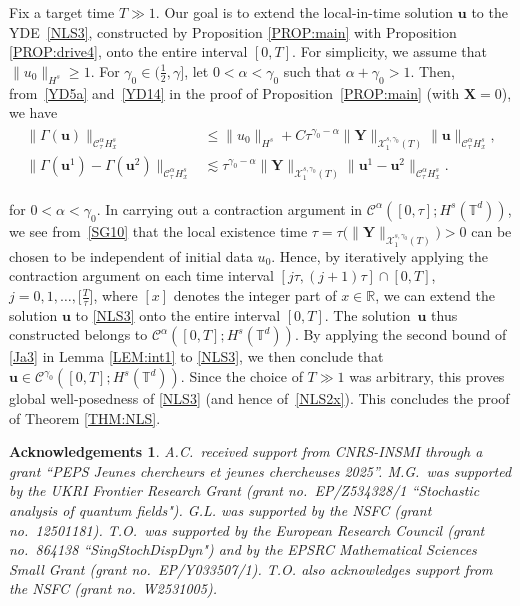 \documentclass[letterpaper, 11pt,  reqno]{amsart}
\newcommand{\1}{\hspace{0.5mm}\textup{I}\hspace{0.5mm}}
\newcommand{\noi}{\noindent}
\newcommand{\R}{\mathbb{R}}
\newcommand{\T}{\mathbb{T}}
\newcommand{\CC}{\mathcal{C}}
\newcommand{\al}{\alpha}
\newcommand{\g}{\gamma}
\newcommand{\G}{\Gamma}
\newcommand{\les}{\lesssim}
\newcommand{\cC}{\mathcal{C}}
\newcommand{\cX}{\mathcal{X}}
\newcommand{\uu}{\mathbf{u}}
\newcommand{\XX}{\mathbf{X}}
\newcommand{\YY}{\mathbf{Y}}
\newtheorem*{ackno}{Acknowledgements}
\numberwithin{equation}{section}
\numberwithin{theorem}{section}
\begin{document}
Fix a target time $T\gg 1$.
Our goal is to extend the local-in-time solution $\uu$
to the YDE~\eqref{NLS3}, 
constructed by Proposition \ref{PROP:main} with Proposition \ref{PROP:drive4},  
onto the entire interval $[0, T]$.
For simplicity, we assume that $\|u_0\|_{H^s} \ge 1$.
For $ \g_0 \in \big(\frac 12 ,  \g\big]$, 
let $0 < \al < \g_0$ such that $\al + \g_0 >1$.
Then, 
from~\eqref{YD5a} and~\eqref{YD14} in the proof of Proposition~\ref{PROP:main}
(with $\XX = 0$), we have 
\begin{align}
\begin{split}
\|\G(\uu)\|_{\CC^\al_\tau H^s_x}
& \le \|u_0\|_{H^s} 
+  C\tau^{\g_0 - \al}
\|\YY\|_{\cX^{s, \g_0}_1(T)}
\|\uu\|_{\CC^\al_{\tau } H^s_x}, \\
 \|\G(\uu^1)- \G(\uu^2)\|_{\cC^\al _{\tau} H^s_x}
&  \les 
\tau^{\g_0 - \al}
\|\YY\|_{\cX^{s, \g_0}_1(T)}\|\uu^1- \uu^2 \|_{\CC^\al _\tau H^s_x}.
\end{split}
\label{SG10}
\end{align}

\noi
for $0 < \al < \g_0$.
In carrying out a contraction argument in 
$\cC^\al([0, \tau]; H^s(\T^d))$, 
we see from~\eqref{SG10}
that the local existence time $\tau = \tau \big(\|\YY\|_{\cX^{s, \g_0}_1(T)}\big) >0$
can be chosen to be  independent  of initial data $u_0$.
Hence, by  iteratively applying the contraction argument 
on each time interval $[j\tau, (j+1)\tau]\cap [0, T]$, $j = 0,1,  \dots, \big[\frac T\tau\big] $, 
where $[x]$ denotes the integer part of $x \in \R$, 
we can extend the solution $\uu$ to \eqref{NLS3}
onto the entire interval $[0, T]$.
The solution~$\uu$ thus constructed belongs to 
$\cC^\al([0, T]; H^s(\T^d))$.
By applying the second bound of \eqref{Ja3}
in Lemma \ref{LEM:int1} to \eqref{NLS3}, 
we then conclude that 
$\uu \in \cC^{\g_0}([0, T]; H^s(\T^d))$.
Since the choice of $T\gg1$ was arbitrary, 
this proves global well-posedness of \eqref{NLS3}
(and hence of~\eqref{NLS2x}).
This concludes the proof of  Theorem \ref{THM:NLS}.





\begin{ackno}\rm
A.C.~received support from CNRS-INSMI through a grant ``PEPS Jeunes chercheurs et jeunes chercheuses 2025''.
M.G.~was supported by 
the UKRI Frontier Research Grant 
(grant no.~EP/Z534328/1 ``Stochastic analysis of quantum fields"). 
G.L. was supported by the NSFC (grant no.~12501181).
T.O.~was supported by the European Research Council (grant no.~864138 ``SingStochDispDyn")
and  by the EPSRC 
Mathematical Sciences
Small Grant  (grant no.~EP/Y033507/1).
T.O. also 
acknowledges support from  
the NSFC (grant no.~W2531005).


\end{ackno}
\end{document}
